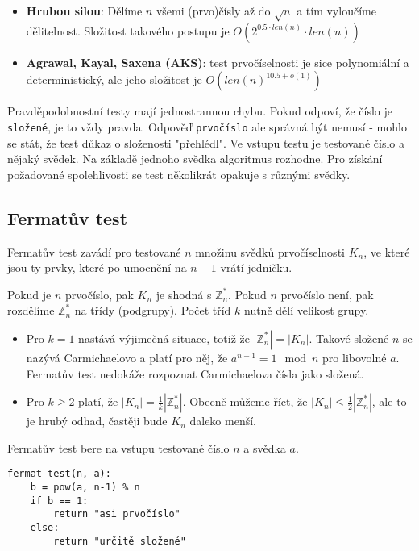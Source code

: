 \documentclass[10pt,a4paper]{article}
\begin{document}
\begin{itemize}
\item \textbf{Hrubou silou}: Dělíme $n$ všemi (prvo)čísly až do $\sqrt{n}$ a tím
vyloučíme dělitelnost. Složitost takového postupu je $O(2^{0.5\cdot len(n)}\cdot
len(n))$
\item \textbf{Agrawal, Kayal, Saxena (AKS)}:  test prvočíselnosti je sice
polynomiální a deterministický, ale jeho složitost je $O(len(n)^{10.5 + o(1)})$
\end{itemize}

Pravděpodobnostní testy mají jednostrannou chybu. Pokud odpoví, že číslo je
\texttt{složené}, je to vždy pravda. Odpověď \texttt{prvočíslo} ale správná být
nemusí - mohlo se stát, že test důkaz o složenosti "přehlédl". Ve vstupu testu
je testované číslo a nějaký svědek. Na základě jednoho svědka algoritmus
rozhodne. Pro získání požadované spolehlivosti se test několikrát opakuje s
různými svědky.

\subsection{Fermatův test}
Fermatův test zavádí pro testované $n$ množinu svědků prvočíselnosti $K_n$, ve
které jsou ty prvky, které po umocnění na $n-1$ vrátí jedničku.

 Pokud je $n$ prvočíslo, pak $K_n$ je shodná s $\mathbb{Z}_n^*$. Pokud $n$
 prvočíslo není, pak rozdělíme $\mathbb{Z}_n^*$ na třídy (podgrupy). Počet tříd
 $k$ nutně dělí velikost grupy.
\begin{itemize}
\item Pro $k = 1$ nastává výjimečná situace, totiž že $|\mathbb{Z}_n^*| =
|K_n|$. Takové složené $n$ se nazývá Carmichaelovo a platí pro něj, že $a^{n-1}
= 1 \mod n$ pro libovolné $a$. Fermatův test nedokáže rozpoznat Carmichaelova
čísla jako složená.
\item Pro $k \geq 2$ platí, že  $|K_n| = \frac{1}{k}|\mathbb{Z}_n^*|$.  Obecně
můžeme říct, že $|K_n| \leq \frac{1}{2}|\mathbb{Z}_n^*|$, ale to je hrubý odhad,
častěji bude $K_n$ daleko menší.
\end{itemize}

Fermatův test bere na vstupu testované číslo $n$ a svědka $a$.
\begin{verbatim}
fermat-test(n, a):
    b = pow(a, n-1) % n
    if b == 1:
        return "asi prvočíslo"
    else:
        return "určitě složené"
\end{verbatim}
\end{document}
